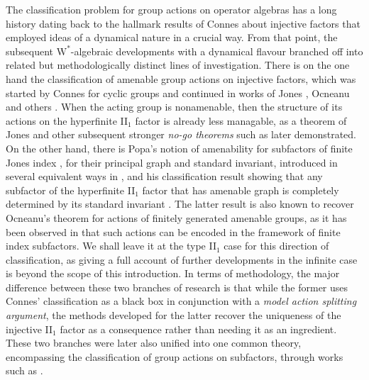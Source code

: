 \documentclass[11pt,a4paper]{article}
\theoremstyle{definition}
\theoremstyle{remark}
\numberwithin{equation}{section}
\numberwithin{theorem}{section}
\begin{document}
The classification problem for group actions on operator algebras has a long history dating back to the hallmark results of Connes \cite{Connes73, Connes74, Connes76} about injective factors that employed ideas of a dynamical nature in a crucial way.
From that point, the subsequent $\mathrm{W}^*$-algebraic developments with a dynamical flavour branched off into related but methodologically distinct lines of investigation.
There is on the one hand the classification of amenable group actions on injective factors, which was started by Connes \cite{Connes75, Connes77} for cyclic groups and continued in works of Jones \cite{Jones80}, Ocneanu \cite{Ocneanu85} and others \cite{SutherlandTakesaki89, KawahigashiSutherlandTakesaki92, KatayamaSutherlandTakesaki98, Masuda13}.
When the acting group is nonamenable, then the structure of its actions on the hyperfinite II$_1$ factor is already less managable, as a theorem of Jones \cite{Jones83oc} and other subsequent stronger \emph{no-go theorems} such as \cite{Popa06, BrothierVaes15} later demonstrated.
On the other hand, there is Popa's notion of amenability for subfactors of finite Jones index \cite{Jones83}, for their principal graph and standard invariant, introduced in several equivalent ways in \cite{Popa94, Popa97survey, Popa99, Popa23}, and his classification result showing that any subfactor of the hyperfinite II$_1$ factor that has amenable graph is completely determined by its standard invariant \cite{Popa95survey, Popa97survey, Popa99, Popa23}.
The latter result is also known to recover Ocneanu's theorem for actions of finitely generated amenable groups, as it has been observed in \cite[Subsection 5.1.5]{Popa94} that such actions can be encoded in the framework of finite index subfactors.
We shall leave it at the type II$_1$ case for this direction of classification, as giving a full account of further developments in the infinite case is beyond the scope of this introduction.
In terms of methodology, the major difference between these two branches of research is that while the former uses Connes' classification as a black box in conjunction with a \emph{model action splitting argument}, the methods developed for the latter recover the uniqueness of the injective II$_1$ factor as a consequence rather than needing it as an ingredient.
These two branches were later also unified into one common theory, encompassing the classification of group actions on subfactors, through works such as \cite{Popa92, Popa10}.
\end{document}
